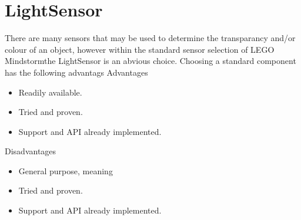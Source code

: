 \section{LightSensor}
There are many sensors that may be used to determine the transparancy and/or colour of an object, however within the standard sensor selection of LEGO Mindstorm\textregistered the LightSensor is an abvious choice. Choosing a standard component has the following advantags
\noindent Advantages
\begin{itemize}
    \item Readily available.
    \item Tried and proven.
    \item Support and API already implemented.
\end{itemize}
\noindent Disadvantages
\begin{itemize}
    \item General purpose, meaning
    \item Tried and proven.
    \item Support and API already implemented.
\end{itemize}
